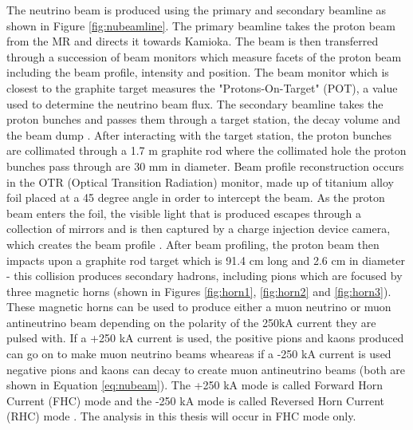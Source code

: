 The neutrino beam is produced using the primary and secondary beamline as shown in Figure \ref{fig:nubeamline}. The primary beamline takes the proton beam from the MR and directs it towards Kamioka. The beam is then transferred through a succession of beam monitors which measure facets of the proton beam including the beam profile, intensity and position. The beam monitor which is closest to the graphite target measures the "Protons-On-Target" (POT), a value used to determine the neutrino beam flux. The secondary beamline takes the proton bunches and passes them through a target station, the decay volume and the beam dump \cite{sekiguchi2008neutrino}. After interacting with the target station, the proton bunches are collimated through a 1.7 m graphite rod where the collimated hole the proton bunches pass through are 30 mm in diameter. Beam profile reconstruction occurs in the OTR (Optical Transition Radiation) monitor, made up of titanium alloy foil placed at a 45 degree angle in order to intercept the beam. As the proton beam enters the foil, the visible light that is produced escapes through a collection of mirrors and is then captured by a charge injection device camera, which creates the beam profile \cite{bhadra2013optical}. 
\newline
After beam profiling, the proton beam then impacts upon a graphite rod target which is 91.4 cm long and 2.6 cm in diameter - this collision produces secondary hadrons, including pions which are focused by three magnetic horns (shown in Figures \ref{fig:horn1}, \ref{fig:horn2} and \ref{fig:horn3}). These magnetic horns can be used to produce either a muon neutrino or muon antineutrino beam depending on the polarity of the 250kA current they are pulsed with. If a +250 kA current is used, the positive pions and kaons produced can go on to make muon neutrino beams wheareas if a -250 kA current is used negative pions and kaons can decay to create muon antineutrino beams (both are shown in Equation \ref{eq:nubeam}). The +250 kA mode is called Forward Horn Current (FHC) mode and the -250 kA mode is called Reversed Horn Current (RHC) mode \cite{sekiguchi2008t2k}. The analysis in this thesis will occur in FHC mode only. 


